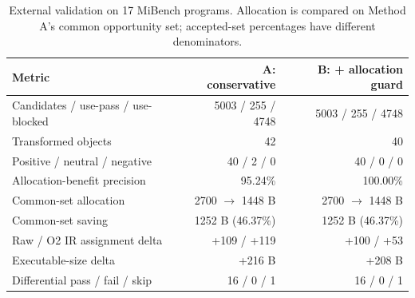 \begin{table}[t]
\centering
\caption{External validation on 17 MiBench programs. Allocation is compared on Method A's common opportunity set; accepted-set percentages have different denominators.}
\label{tab:external-mibench}
\small
\setlength{\tabcolsep}{5pt}
\begin{tabular}{lrr}
\toprule
Metric & A: conservative & B: + allocation guard \\
\midrule
Candidates / use-pass / use-blocked & 5003 / 255 / 4748 & 5003 / 255 / 4748 \\
Transformed objects & 42 & 40 \\
Positive / neutral / negative & 40 / 2 / 0 & 40 / 0 / 0 \\
Allocation-benefit precision & 95.24\% & 100.00\% \\
Common-set allocation & 2700 $\rightarrow$ 1448 B & 2700 $\rightarrow$ 1448 B \\
Common-set saving & 1252 B (46.37\%) & 1252 B (46.37\%) \\
Raw / O2 IR assignment delta & +109 / +119 & +100 / +53 \\
Executable-size delta & +216 B & +208 B \\
Differential pass / fail / skip & 16 / 0 / 1 & 16 / 0 / 1 \\
\bottomrule
\end{tabular}
\end{table}
